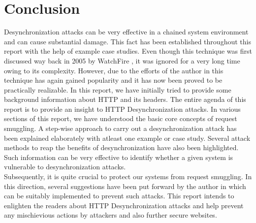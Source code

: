 \chapter{Conclusion}
Desynchronization attacks can be very effective in a chained system environment and can cause substantial damage. This fact has been established throughout this report with the help of example case studies. Even though this technique was first discussed way back in 2005 by WatchFire \cite{b5}, it was ignored for a very long time owing to its complexity. However, due to the efforts of the author in \cite{b6} this technique has again gained popularity and it has now been proved to be practically realizable. In this report, we have initially tried to provide some background information about HTTP and its headers. The entire agenda of this report is to provide an insight to HTTP Desynchronization attacks. In various sections of this report, we have understood the basic core concepts of request smuggling. A step-wise approach to carry out a desynchronization attack has been explained elaborately with atleast one example or case study. Several attack methods to reap the benefits of desynchronization have also been highlighted. Such information can be very effective to identify whether a given system is vulnerable to desynchronization attacks. \\
Subsequently, it is quite crucial to protect our systems from request smuggling. In this direction, several suggestions have been put forward by the author in \cite{b6} which can be suitably implemented to prevent such attacks. This report intends to enlighten the readers about HTTP Desynchronization attacks and help prevent any mischievious actions by attackers and also further secure websites. 